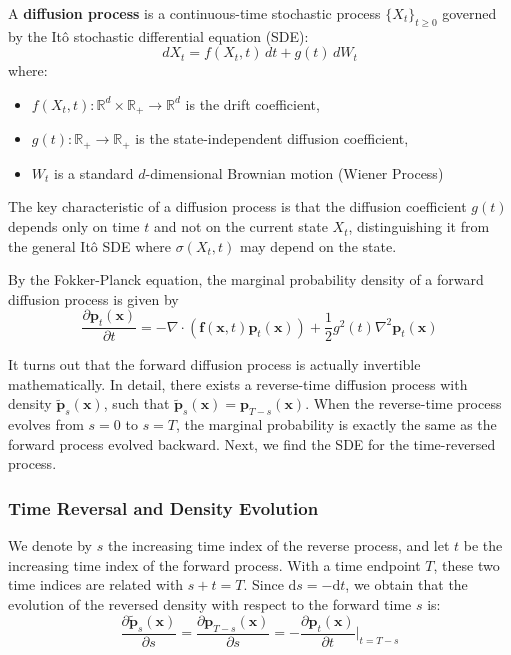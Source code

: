\documentclass{article}
\begin{document}
\begin{definition}
A \textbf{diffusion process} is a continuous-time stochastic process $\{X_t\}_{t \geq 0}$ governed by the Itô stochastic differential equation (SDE):
\begin{equation}
dX_t = f(X_t, t) \, dt + g(t) \, dW_t
\end{equation}
where:
\begin{itemize}
    \item $f(X_t, t): \mathbb{R}^d \times \mathbb{R}_+ \to \mathbb{R}^d$ is the drift coefficient,
    \item $g(t): \mathbb{R}_+ \to \mathbb{R}_+$ is the state-independent diffusion coefficient,
    \item $W_t$ is a standard $d$-dimensional Brownian motion (Wiener Process)
\end{itemize}
The key characteristic of a diffusion process is that the diffusion coefficient $g(t)$ depends only on time $t$ and not on the current state $X_t$, distinguishing it from the general Itô SDE where $\sigma(X_t, t)$ may depend on the state.
\end{definition}

By the Fokker-Planck equation, the marginal probability density of a forward diffusion process is given by
%
\begin{equation}
    \frac{\partial \mathbf{p}_t(\mathbf{x})}{\partial t} = -\nabla \cdot \left(\mathbf{f}(\mathbf{x}, t) \mathbf{p}_t(\mathbf{x})\right) + \frac{1}{2} g^2(t) \nabla^2 \mathbf{p}_t(\mathbf{x})
    \label{eq:fokker_planck}
\end{equation}

It turns out that the forward diffusion process is actually invertible mathematically. 
In detail, there exists a reverse-time diffusion process with density $\tilde{\mathbf{p}}_s(\mathbf{x})$, such that $\tilde{\mathbf{p}}_s(\mathbf{x}) = \mathbf{p}_{T-s}(\mathbf{x})$. When the reverse-time process evolves from $s=0$ to $s=T$, the marginal probability is exactly the same as the forward process evolved backward. 
Next,  we find the SDE for the time-reversed process. 

\subsubsection{Time Reversal and Density Evolution}
We denote by $s$ the increasing time index of the reverse process, and let $t$ be the increasing time index of the forward process. With a time endpoint $T$, these two time indices are related with $s+t=T$. 
Since $\mathrm{d}s = - \mathrm{d}t$, we obtain that the evolution of the reversed density with respect to the forward time $s$ is:
\begin{equation}
    \frac{\partial \tilde{\mathbf{p}}_s(\mathbf{x})}{\partial s} = \frac{\partial \mathbf{p}_{T-s}(\mathbf{x})}{\partial s} = -\frac{\partial \mathbf{p}_t(\mathbf{x})}{\partial t}\Big|_{t=T-s}
    \label{eq:reversed_time_derivative}
\end{equation}
\end{document}
